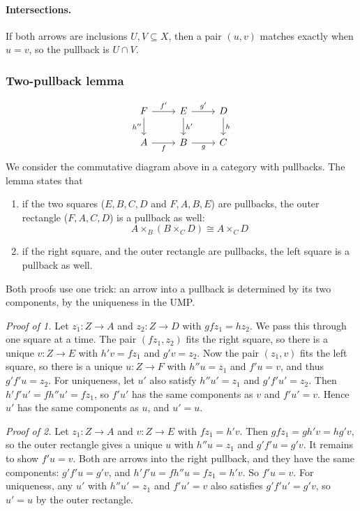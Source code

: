 \documentclass[11pt]{article}
\begin{document}
\paragraph{Intersections.} If both arrows are inclusions $U, V \subseteq X$,
then a pair $(u, v)$ matches exactly when $u = v$, so the pullback is $U \cap
V$.

\subsubsection{Two-pullback lemma}

\[
\begin{tikzcd}
  F \ar[r, "f'"] \ar[d, "h''"'] & E \ar[r, "g'"] \ar[d, "h'"] & D \ar[d, "h"] \\
  A \ar[r, "f"'] & B \ar[r, "g"'] & C
\end{tikzcd}
\]
We consider the commutative diagram above in a category with pullbacks. The
lemma states that
\begin{enumerate}
  \item if the two squares ($E, B, C, D$ and $F, A, B, E$) are pullbacks, the
    outer rectangle ($F, A, C, D$) is a pullback as well:
    $$
    A \times_{B} (B \times_{C} D) \cong A \times_{C} D
    $$
  \item if the right square, and the outer rectangle are pullbacks, the left
    square is a pullback as well.
\end{enumerate}

Both proofs use one trick: an arrow into a pullback is determined by its two
components, by the uniqueness in the UMP.

\textit{Proof of 1.} Let $z_{1}: Z \rightarrow A$ and $z_{2}: Z \rightarrow D$
with $gfz_{1} = hz_{2}$. We pass this through one square at a time. The pair
$(fz_{1}, z_{2})$ fits the right square, so there is a unique $v: Z
\rightarrow E$ with $h'v = fz_{1}$ and $g'v = z_{2}$. Now the pair $(z_{1}, v)$
fits the left square, so there is a unique $u: Z \rightarrow F$ with $h''u =
z_{1}$ and $f'u = v$, and thus $g'f'u = z_{2}$. For uniqueness, let $u'$ also
satisfy $h''u' = z_{1}$ and $g'f'u' = z_{2}$. Then $h'f'u' = fh''u' = fz_{1}$,
so $f'u'$ has the same components as $v$ and $f'u' = v$. Hence $u'$ has the
same components as $u$, and $u' = u$.

\textit{Proof of 2.} Let $z_{1}: Z \rightarrow A$ and $v: Z \rightarrow E$ with
$fz_{1} = h'v$. Then $gfz_{1} = gh'v = hg'v$, so the outer rectangle gives a
unique $u$ with $h''u = z_{1}$ and $g'f'u = g'v$. It remains to show $f'u = v$.
Both are arrows into the right pullback, and they have the same components:
$g'f'u = g'v$, and $h'f'u = fh''u = fz_{1} = h'v$. So $f'u = v$. For
uniqueness, any $u'$ with $h''u' = z_{1}$ and $f'u' = v$ also satisfies $g'f'u'
= g'v$, so $u' = u$ by the outer rectangle.
\end{document}
